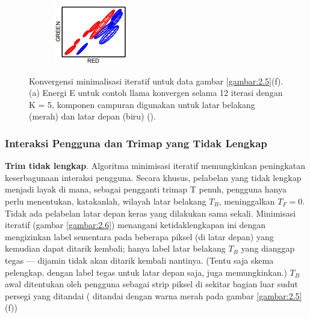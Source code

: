 \begin{figure}[H]
    \begin{subfigure}{0.3\textwidth}
      \centering{}
      \includegraphics[width=\textwidth]{gambar/gambar-2_7(c).png}
      \caption{}
    \end{subfigure}  
  \caption{
    Konvergensi minimalisasi iteratif untuk data gambar \ref{gambar:2.5}(f). (a) Energi E untuk contoh 
    llama konvergen selama 12 iterasi dengan K = 5, komponen campuran digunakan untuk latar belakang (merah) dan latar depan (biru) (\cite{Rother:2004}). 
    }
    \label{gambar:2.7}
\end{figure}

\subsubsection{{Interaksi Pengguna dan Trimap yang Tidak Lengkap}}

\textbf{Trim tidak lengkap}. Algoritma minimisasi iteratif memungkinkan peningkatan 
keserbagunaan interaksi pengguna. Secara khusus, pelabelan yang tidak lengkap menjadi 
layak di mana, sebagai pengganti trimap T penuh, pengguna hanya perlu menentukan, 
katakanlah, wilayah latar belakang \(T_{B}\), meninggalkan \(T_{F} = 0\). Tidak ada pelabelan latar 
depan keras yang dilakukan sama sekali. Minimisasi iteratif (gambar \ref{gambar:2.6}) menangani 
ketidaklengkapan ini dengan mengizinkan label sementara pada beberapa piksel (di 
latar depan) yang kemudian dapat ditarik kembali; hanya label latar belakang \(T_{B}\) 
yang dianggap tegas — dijamin tidak akan ditarik kembali nantinya. (Tentu saja 
skema pelengkap, dengan label tegas untuk latar depan saja, juga memungkinkan.) 
\(T_{B}\) awal ditentukan oleh pengguna sebagai strip piksel di sekitar bagian 
luar sudut persegi yang ditandai ( ditandai dengan warna merah pada gambar \ref{gambar:2.5}(f))

